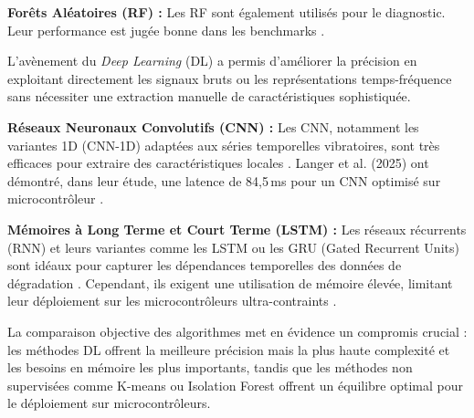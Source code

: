 \textbf{Forêts Aléatoires (RF) :} Les RF sont également utilisés pour le diagnostic. Leur performance est jugée bonne dans les benchmarks \cite{bagri2024}.

L'avènement du \textit{Deep Learning} (DL) a permis d'améliorer la précision en exploitant directement les signaux bruts ou les représentations temps-fréquence sans nécessiter une extraction manuelle de caractéristiques sophistiquée.

\textbf{Réseaux Neuronaux Convolutifs (CNN) :} Les CNN, notamment les variantes 1D (CNN-1D) adaptées aux séries temporelles vibratoires, sont très efficaces pour extraire des caractéristiques locales \cite{bagri2024,langer2025}. Langer et al. (2025) ont démontré, dans leur étude, une latence de 84,5\,ms pour un CNN optimisé sur microcontrôleur \cite{langer2025}.

\textbf{Mémoires à Long Terme et Court Terme (LSTM) :} Les réseaux récurrents (RNN) et leurs variantes comme les LSTM ou les GRU (Gated Recurrent Units) sont idéaux pour capturer les dépendances temporelles des données de dégradation \cite{ran2019,bagri2024}. Cependant, ils exigent une utilisation de mémoire élevée, limitant leur déploiement sur les microcontrôleurs ultra-contraints \cite{gupta2025}.

La comparaison objective des algorithmes met en évidence un compromis crucial : les méthodes DL offrent la meilleure précision mais la plus haute complexité et les besoins en mémoire les plus importants, tandis que les méthodes non supervisées comme K-means ou Isolation Forest offrent un équilibre optimal pour le déploiement sur microcontrôleurs.


